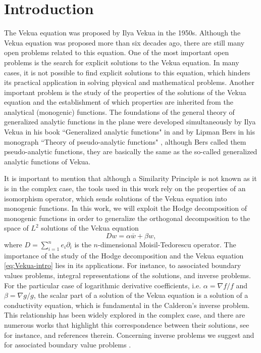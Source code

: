 \documentclass[12pt]{article}
\begin{document}
\section{Introduction}
The Vekua equation was proposed by Ilya Vekua in the 1950s. Although the Vekua equation was proposed more than six decades ago, there are still many open problems related to this equation.
One of the most important open problems is the search for explicit solutions to the Vekua equation. In many cases, it is not possible to find explicit solutions to this equation, which hinders its practical application in solving physical and mathematical problems.
Another important problem is the study of the properties of the solutions of the Vekua equation and the establishment of which properties are inherited from the analytical (monogenic) functions. 
The foundations of the general theory of generalized analytic functions in the plane were developed simultaneously by Ilya Vekua in his book ``Generalized analytic functions" in \cite{Vekua1962} and by Lipman Bers in his monograph ``Theory of pseudo-analytic functions" \cite{Bers1953}, although Bers called them pseudo-analytic functions, they are basically the same as the so-called generalized analytic functions of Vekua. 

It is important to mention that although a Similarity Principle is not known as it is in the complex case, the tools used in this work rely on the properties of an isomorphism operator, which sends solutions of the Vekua equation into monogenic functions. 
In this work, we will exploit the Hodge decomposition of monogenic functions in order to generalize the orthogonal decomposition to the space of $L^2$ solutions of the Vekua equation
\begin{equation}\label{eq:Vekua-intro}
  Dw=\alpha \overline{w}+\beta w,
\end{equation}
where $D=\sum_{i=1}^n e_i\partial_i$ is the $n$-dimensional Moisil-Tedorescu operator. The importance of the study of the Hodge decomposition and the Vekua equation \eqref{eq:Vekua-intro} lies in its applications. For instance, to associated boundary values problems, integral representations of the solutions, and inverse problems. For the particular case of logarithmic derivative coefficients, i.e. $\alpha=\nabla f/f$ and $\beta=\nabla g/g$, the scalar part of a solution of the Vekua equation is a solution of a conductivity equation, which is fundamental in the Calderon's inverse problem. This relationship has been widely explored in the complex case, and there are numerous works that highlight this correspondence between their solutions, see for instance,  \cite{BLRR2010, BFL2011, Krav2009} and references therein. Concerning inverse problems we suggest \cite{AstPai2006, Fischer-1, Fischer-2, Fischer-3} and for associated boundary value problems \cite{Bers1954, Vekua1962}.
\end{document}
